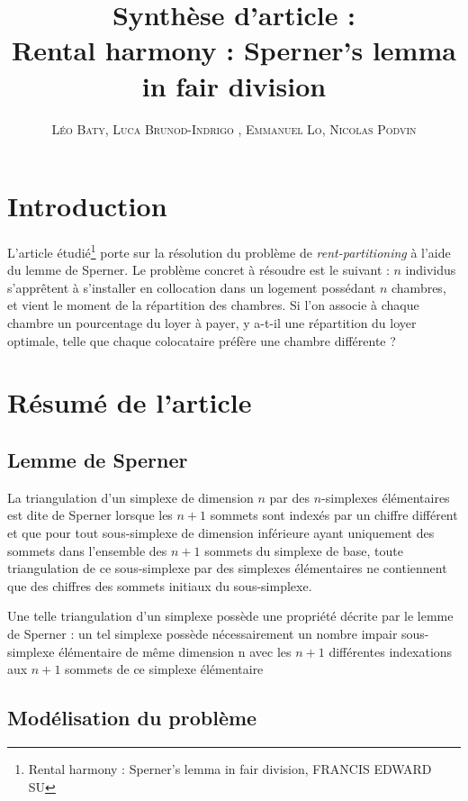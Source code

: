 \documentclass[12pt,twoside,a4paper]{article}
\title{\textbf{Synth\`ese d'article} :\\ Rental harmony : Sperner's lemma in fair division}
\author{\textsc{L\'eo Baty, Luca Brunod-Indrigo , Emmanuel Lo, Nicolas Podvin}}
\date{}
\begin{document}
\maketitle


\tableofcontents

\section{Introduction}

L'article \'etudi\'e\footnote{Rental harmony : Sperner's lemma in fair division, FRANCIS EDWARD SU} porte sur la r\'esolution du probl\`eme de \textit{rent-partitioning} \`a l'aide du lemme de Sperner. Le probl\`eme concret \`a r\'esoudre est le suivant : $n$ individus s'appr\^{e}tent \`a s'installer en collocation dans un logement poss\'edant $n$ chambres, et vient le moment de la r\'epartition des chambres. Si l'on associe \`a chaque chambre un pourcentage du loyer \`a payer, y a-t-il une r\'epartition du loyer optimale, telle que chaque colocataire pr\'ef\`ere une chambre diff\'erente ? 

\section{R\'esum\'e de l'article}

\subsection{Lemme de Sperner}

La triangulation d'un simplexe de dimension $n$ par des $n$-simplexes \'el\'ementaires est dite de Sperner lorsque les $n+1$ sommets sont index\'es par un chiffre diff\'erent et que pour tout sous-simplexe de dimension inférieure ayant uniquement des sommets dans l'ensemble des $n+1$ sommets du simplexe de base, toute triangulation de ce sous-simplexe par des simplexes \'el\'ementaires ne contiennent que des chiffres des sommets initiaux du sous-simplexe.

Une telle triangulation d'un simplexe poss\`ede une propriété d\'ecrite par le lemme de Sperner : un tel simplexe possède n\'ecessairement un nombre impair sous-simplexe élémentaire de même dimension n avec les $n+1$ différentes indexations aux $n+1$ sommets de ce simplexe \'el\'ementaire

\subsection{Mod\'elisation du probl\`eme}
\end{document}
